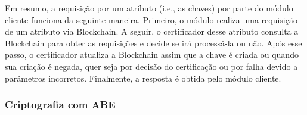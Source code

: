 \documentclass[a4paper,11pt]{article}
\begin{document}



{\color{blue}Em resumo, a requisição por um atributo (i.e., as chaves) por parte do módulo cliente funciona da seguinte maneira. Primeiro, o módulo realiza uma requisição de um atributo via Blockchain. A seguir, o certificador desse atributo consulta a Blockchain para obter as requisições e decide se irá processá-la ou não. Após esse passo, o certificador atualiza a Blockchain assim que a chave é criada ou quando sua criação é negada, quer seja por decisão do certificação ou por falha devido a parâmetros incorretos. Finalmente, a resposta é obtida pelo módulo cliente.}

\subsubsection{Criptografia com ABE}

\end{document}
